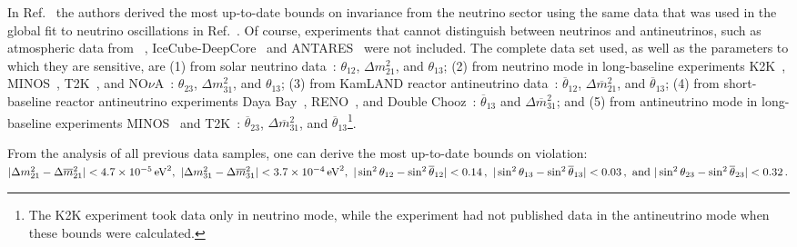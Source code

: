 In Ref.~\cite{Barenboim:2017ewj} the authors derived the most up-to-date bounds on  invariance from the neutrino sector %
using the same data that was used in the global fit to neutrino oscillations in Ref.~\cite{deSalas:2017kay}. 
Of course, experiments that cannot distinguish between neutrinos and antineutrinos, such as atmospheric data from \superk~\cite{Abe:2017aap}, IceCube-DeepCore~\cite{Aartsen:2014yll,Aartsen:2017nmd} and ANTARES~\cite{AdrianMartinez:2012ph} were not included. The complete data set used, as well as the parameters to which they are sensitive, are %
%
 (1) from solar neutrino data~\cite{Cleveland:1998nv,Kaether:2010ag,Abdurashitov:2009tn,hosaka:2005um,Cravens:2008aa,Abe:2010hy,Nakano:PhD,Aharmim:2008kc,Aharmim:2009gd,Bellini:2013lnn}:  $\theta_{12}$, $\Delta m_{21}^2$, and $\theta_{13}$;
 (2) from neutrino mode in long-baseline experiments K2K~\cite{Ahn:2006zza}, MINOS~\cite{Adamson:2013whj,Adamson:2014vgd}, T2K~\cite{Abe:2017uxa,Abe:2017bay}, and NO$\nu$A~\cite{Adamson:2017qqn,Adamson:2017gxd}:  $\theta_{23}$, $\Delta m_{31}^2$, and $\theta_{13}$;
 (3) from KamLAND reactor antineutrino data~\cite{Gando:2010aa}: $\overline{\theta}_{12}$, $\Delta \overline{m}_{21}^2$, and $\overline{\theta}_{13}$;
 (4) from short-baseline reactor antineutrino experiments Daya Bay~\cite{An:2016ses}, RENO~\cite{RENO:2015ksa}, and Double Chooz~\cite{Abe:2014bwa}:     $\overline{\theta}_{13}$ and $\Delta \overline{m}_{31}^2$; and 
 (5) from antineutrino mode in long-baseline experiments MINOS~\cite{Adamson:2013whj,Adamson:2014vgd} and T2K~\cite{Abe:2017uxa,Abe:2017bay}: $\overline{\theta}_{23}$, $\Delta \overline{m}_{31}^2$, and
$\overline{\theta}_{13}$\footnote{The K2K experiment took  data only in neutrino mode, while the \nova experiment had not published data in the antineutrino mode when these bounds were calculated.}. %

From the analysis of all previous data samples, one can derive the most up-to-date bounds on  violation:
%
$ |\Delta m_{21}^2-\Delta \overline{m}_{21}^2| < 4.7\times 10^{-5} \,  \text{eV}^2,\,\,
 |\Delta m_{31}^2-\Delta \overline{m}_{31}^2| < 3.7\times 10^{-4} \, \text{eV}^2,\,\,
 |\sin^2\theta_{12}-\sin^2\overline{\theta}_{12}| < 0.14\,,\,\,
 |\sin^2\theta_{13}-\sin^2\overline{\theta}_{13}| < 0.03\,, \,\,
 {\rm and}~|\sin^2\theta_{23}-\sin^2\overline{\theta}_{23}| < 0.32\,.
 $  %

